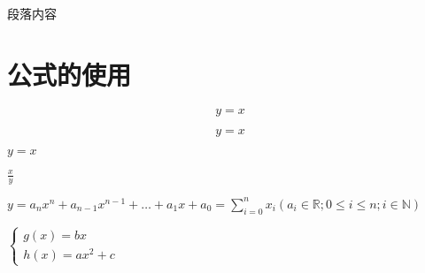 \documentclass{article}
\begin{document}
\begin{CJK}{UTF8}{gkai}

\title{}%
\date{}
\author{张舒悦}
\maketitle

\section{}%
段落内容
\subsection{}%




\section{公式的使用}
\begin{equation}%
y = x
\end{equation}

$$y = x$$%

$y = x$%

$\frac{x}{y}$%

$y = a_nx^n + a_{n-1}x^{n-1} + \ldots + a_1x + a_0 = \sum_{i=0}^{n}{x_i}(a_i \in \mathbb{R}; 0 \le i \le n; i \in \mathbb{N})$%

$\begin{cases}%
g(x) = bx\\
h(x) = ax^2 +  c
\end{cases}$



\end{CJK}
\end{document}
